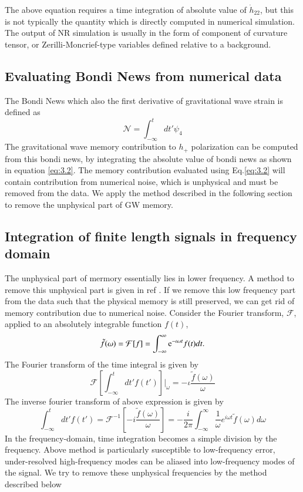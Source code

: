 \documentclass[twocolumn,showpacs,aps,prd,nobibnotes,floatfix]{revtex4-1}
\begin{document}
The above equation requires a time integration of absolute value of $\dot{h}_{22}$, but this is not typically the quantity which is directly computed in numerical simulation. The output of NR simulation is usually in the form of component of curvature tensor, or Zerilli-Moncrief-type variables defined relative to a background. 
\subsection{Evaluating Bondi News from numerical data}
The Bondi News which also the first derivative of gravitational wave strain is defined as
\begin{equation}\label{3.3}
\mathcal{N} = \int_{-\infty}^{t}dt' \psi_4
\end{equation}
The gravitational wave memory contribution to $h_{+}$ polarization can be computed from this bondi news, by integrating the absolute value of bondi news as shown in equation \ref{eq:3.2}. The memory contribution evaluated using Eq.\ref{eq:3.2} will contain contribution from numerical noise, which is unphysical and must be removed from the data. We apply the method described in the following section to remove the unphysical part of GW memory. 
\subsection{Integration of finite length signals in frequency domain}
The unphysical part of mermory essentially lies in lower frequency. A method to remove this unphysical part is given in ref \cite{Reisswig_Pollney2011}. If we remove this low frequency part from the data such that the physical memory is still preserved, we can get rid of memory contribution due to numerical noise. 
Consider the Fourier transform, $\mathcal{F}$, applied to an absolutely integrable function $f(t)$,
\begin{equation}
	\tilde{f}(\omega) = \mathcal{F}[f]=\int_{-\infty}^{\infty}\mathrm{e}^{-\iota \omega t}f(t)dt.	
\end{equation} 
The Fourier transform of the time integral is given by
\begin{equation}
	\mathcal{F}\left[\int_{-\infty}^{t}dt' f(t')\right] |_\omega = -\iota \frac{\tilde{f}(\omega)}{\omega}
\end{equation}
The inverse fourier transform of above expression is given by
\begin{equation}\label{3.6}
	\int_{-\infty}^{t}dt'f(t')=\mathcal{F}^{-1}\left[-\mathit{i}\frac{\tilde{f}(\omega)}{\omega}\right] = -\frac{\mathit{i}}{2\pi}\int_{-\infty}^{\infty}\frac{1}{\omega}e^{\mathit{i\omega t}}\tilde{f}(\omega)d\omega
\end{equation}
In the frequency-domain, time integration becomes a simple division by the frequency. Above method is particularly susceptible to low-frequency error, under-resolved high-frequency modes can be aliased into low-frequency modes of the signal. We try to remove these unphysical frequencies by the method described below   
\end{document}
